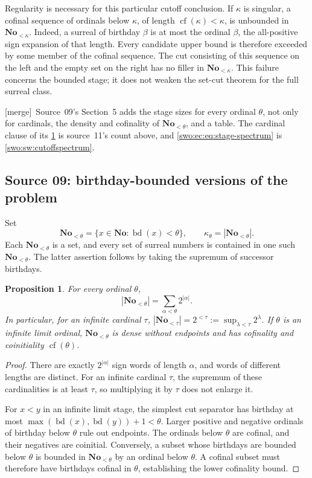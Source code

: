 \documentclass[11pt]{article}
\newtheorem{proposition}[proposition]{Proposition}
\theoremstyle{definition}
\theoremstyle{remark}
\newcommand{\No}{\mathbf{No}}
\newcommand{\cf}{\operatorname{cf}}
\newcommand{\bd}{\operatorname{bd}}
\newcommand{\merge}{\textsf{[merge]}}
\begin{document}
Regularity is necessary for this particular cutoff conclusion.
If \(\kappa\) is singular, a cofinal sequence of ordinals below
\(\kappa\), of length \(\cf(\kappa)<\kappa\), is unbounded
in \(\No_{<\kappa}\).  Indeed, a surreal of birthday \(\beta\)
is at most the ordinal \(\beta\), the all-positive sign
expansion of that length.  Every candidate upper bound is
therefore exceeded by some member of the cofinal sequence.
The cut consisting of this sequence on the left and the
empty set on the right has no filler in \(\No_{<\kappa}\).
This failure concerns the bounded stage; it does not weaken
the set-cut theorem for the full surreal class.


\merge\ Source~09's Section~5 adds the stage sizes for every ordinal $\theta$,
not only for cardinals, the density and cofinality of $\No_{<\theta}$, and a
table. The cardinal clause of its \cref{swo:ec:prop:stage-size} is source~11's
count above, and \eqref{swo:ec:eq:stage-spectrum} is
\cref{swo:sw:cutoffspectrum}.

\subsection{Source 09: birthday-bounded versions of the problem}
\label{swo:ec:sec:birthdays}
Set
\[
    \No_{<\theta}
       =\{x\in\No:\bd(x)<\theta\},
    \qquad \kappa_\theta=|\No_{<\theta}|.
\]
Each $\No_{<\theta}$ is a set, and every set of surreal numbers is contained
in one such $\No_{<\theta}$. The latter assertion follows by taking the
supremum of successor birthdays.

\begin{proposition}\label{swo:ec:prop:stage-size}
For every ordinal $\theta$,
\[
             |\No_{<\theta}|=\sum_{\alpha<\theta}2^{|\alpha|}.
\]
In particular, for an infinite cardinal $\tau$,
$|\No_{<\tau}|=2^{<\tau}:=\sup_{\lambda<\tau}2^\lambda$.
If $\theta$ is an infinite limit ordinal, $\No_{<\theta}$ is dense without
endpoints and has cofinality and coinitiality $\cf(\theta)$.
\end{proposition}
\begin{proof}
There are exactly $2^{|\alpha|}$ sign words of length $\alpha$, and words
of different lengths are distinct. For an infinite cardinal $\tau$, the
supremum of these cardinalities is at least $\tau$, so multiplying it
by $\tau$ does not enlarge it.

For $x<y$ in an infinite limit stage, the simplest cut separator has
birthday at most $\max(\bd(x),\bd(y))+1<\theta$. Larger positive and
negative ordinals of birthday below $\theta$ rule out endpoints. The
ordinals below $\theta$ are cofinal, and their negatives are coinitial.
Conversely, a subset whose birthdays are bounded below $\theta$ is
bounded in $\No_{<\theta}$ by an ordinal below $\theta$. A cofinal subset
must therefore have birthdays cofinal in $\theta$, establishing the
lower cofinality bound.
\end{proof}
\end{document}
